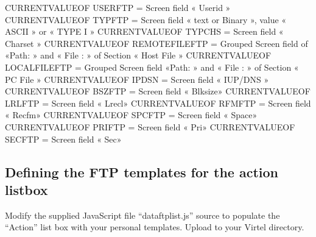 \documentclass[letterpaper,10pt,english]{sphinxmanual}
\begin{document}
\begin{sphinxVerbatim}[commandchars=\\\{\}]
\PYGZob{}\PYGZob{}\PYGZob{}CURRENT\PYGZhy{}VALUE\PYGZhy{}OF \PYGZdq{}USERFTP\PYGZdq{}\PYGZcb{}\PYGZcb{}\PYGZcb{}    = Screen field « Userid »
\PYGZob{}\PYGZob{}\PYGZob{}CURRENT\PYGZhy{}VALUE\PYGZhy{}OF \PYGZdq{}TYPFTP\PYGZdq{}\PYGZcb{}\PYGZcb{}\PYGZcb{}     = Screen field « text or Binary », value « ASCII » or « TYPE I »
\PYGZob{}\PYGZob{}\PYGZob{}CURRENT\PYGZhy{}VALUE\PYGZhy{}OF \PYGZdq{}TYPCHS\PYGZdq{}\PYGZcb{}\PYGZcb{}\PYGZcb{}     = Screen field « Charset »
\PYGZob{}\PYGZob{}\PYGZob{}CURRENT\PYGZhy{}VALUE\PYGZhy{}OF \PYGZdq{}REMOTEFILEFTP\PYGZdq{}\PYGZcb{}\PYGZcb{}\PYGZcb{}      = Grouped Screen field of  «Path: » and « File : » of Section « Host File »
\PYGZob{}\PYGZob{}\PYGZob{}CURRENT\PYGZhy{}VALUE\PYGZhy{}OF \PYGZdq{}LOCALFILEFTP\PYGZdq{}\PYGZcb{}\PYGZcb{}\PYGZcb{}       = Grouped Screen field «Path: » and « File : » of Section « PC File »
\PYGZob{}\PYGZob{}\PYGZob{}CURRENT\PYGZhy{}VALUE\PYGZhy{}OF \PYGZdq{}IPDSN\PYGZdq{}\PYGZcb{}\PYGZcb{}\PYGZcb{}      = Screen field « IUP/DNS »
\PYGZob{}\PYGZob{}\PYGZob{}CURRENT\PYGZhy{}VALUE\PYGZhy{}OF \PYGZdq{}BSZFTP\PYGZdq{}\PYGZcb{}\PYGZcb{}\PYGZcb{}     = Screen field « Blksize»
\PYGZob{}\PYGZob{}\PYGZob{}CURRENT\PYGZhy{}VALUE\PYGZhy{}OF \PYGZdq{}LRLFTP\PYGZdq{}\PYGZcb{}\PYGZcb{}\PYGZcb{}     = Screen field « Lrecl»
\PYGZob{}\PYGZob{}\PYGZob{}CURRENT\PYGZhy{}VALUE\PYGZhy{}OF \PYGZdq{}RFMFTP\PYGZdq{}\PYGZcb{}\PYGZcb{}\PYGZcb{}     = Screen field « Recfm»
\PYGZob{}\PYGZob{}\PYGZob{}CURRENT\PYGZhy{}VALUE\PYGZhy{}OF \PYGZdq{}SPCFTP\PYGZdq{}\PYGZcb{}\PYGZcb{}\PYGZcb{}     = Screen field « Space»
\PYGZob{}\PYGZob{}\PYGZob{}CURRENT\PYGZhy{}VALUE\PYGZhy{}OF \PYGZdq{}PRIFTP\PYGZdq{}\PYGZcb{}\PYGZcb{}\PYGZcb{}     = Screen field « Pri»
\PYGZob{}\PYGZob{}\PYGZob{}CURRENT\PYGZhy{}VALUE\PYGZhy{}OF \PYGZdq{}SECFTP\PYGZdq{}\PYGZcb{}\PYGZcb{}\PYGZcb{}     = Screen field « Sec»
\end{sphinxVerbatim}


\subsection{Defining the FTP templates for the action listbox}
\label{\detokenize{Customization:defining-the-ftp-templates-for-the-action-listbox}}
\sphinxAtStartPar
Modify the supplied JavaScript file “dataftplist.js” source to populate the “Action” list box with your personal templates. Upload to your Virtel directory.
\end{document}

